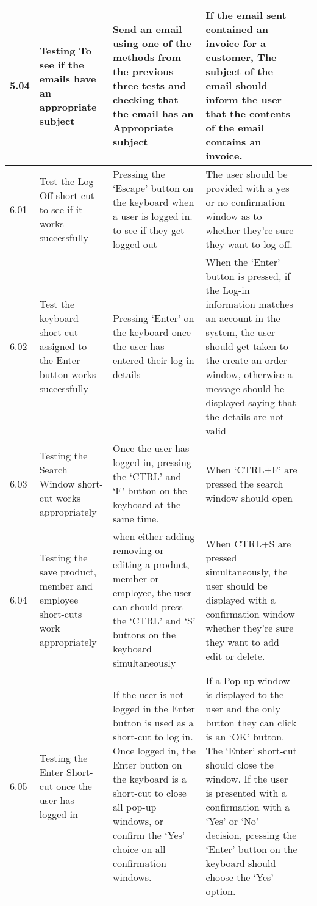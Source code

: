 \begin{flushleft}
\begin{longtable}{|p{1cm}|p{2.5cm}|p{2.5cm}|p{2cm}|p{2cm}|}
	\rowcolor{light-grey} 5.04 & Testing To see if the emails have an appropriate subject & Send an email using one of the methods from the previous three tests and checking that the email has an Appropriate subject & If the email sent contained an invoice for a customer, The subject of the email should inform the user that the contents of the email contains an invoice. & \\ \hline
	\rowcolor{light-grey} 6.01 & Test the Log Off short-cut to see if it works successfully & Pressing the `Escape' button on the keyboard when a user is logged in. to see if they get logged out & The user should be provided with a yes or no confirmation window as to whether they're sure they want to log off.  & \\ \hline
	\rowcolor{light-grey} 6.02 & Test the keyboard short-cut assigned to the Enter button works successfully & Pressing `Enter' on the keyboard once the user has entered their log in details &  When the `Enter' button is pressed, if the Log-in information matches an account in the system, the user should get taken to the create an order window, otherwise a message should be displayed saying that the details are not valid& \\ \hline
	\rowcolor{light-grey} 6.03 & Testing the Search Window short-cut works appropriately &Once the user has logged in, pressing the `CTRL'  and `F' button on the keyboard  at the same time. & When `CTRL+F' are pressed the search window should open&  \\ \hline
	\rowcolor{light-grey} 6.04 & Testing the save product, member and employee short-cuts work appropriately & when either adding removing or editing a product, member or employee, the user can should press the `CTRL' and `S' buttons on the keyboard simultaneously & When CTRL+S are pressed simultaneously, the user should be displayed with a confirmation window whether they're sure they want to add edit or delete.&  \\ \hline
	\rowcolor{light-grey} 6.05 & Testing the Enter Short-cut once the user has logged in & If the user is not logged in the Enter button is used as a short-cut to log in. Once logged in, the Enter button on the keyboard is a short-cut to close all pop-up windows, or confirm the `Yes' choice on all confirmation windows. & If a Pop up window is displayed to the user and the only button they can click is an `OK' button. The `Enter' short-cut should close the window. If the user is presented with a confirmation with a `Yes' or `No' decision, pressing the `Enter' button on the keyboard should choose the `Yes' option. & \\ \hline

\end{longtable}
\end{flushleft}
